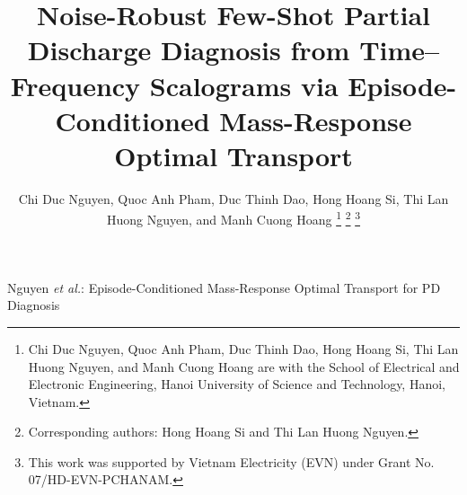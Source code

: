 \documentclass[journal]{IEEEtran}
\newcommand{\1}{\mathbf{1}}
\begin{document}
\title{Noise-Robust Few-Shot Partial Discharge Diagnosis from Time--Frequency Scalograms via Episode-Conditioned Mass-Response Optimal Transport}

\author{Chi Duc Nguyen,
        Quoc Anh Pham,
        Duc Thinh Dao,
        Hong Hoang Si,
        Thi Lan Huong Nguyen,
        and Manh Cuong Hoang%
\thanks{Chi Duc Nguyen, Quoc Anh Pham, Duc Thinh Dao, Hong Hoang Si, Thi Lan Huong Nguyen, and Manh Cuong Hoang are with the School of Electrical and Electronic Engineering, Hanoi University of Science and Technology, Hanoi, Vietnam.}%
\thanks{Corresponding authors: Hong Hoang Si and Thi Lan Huong Nguyen.}%
\thanks{This work was supported by Vietnam Electricity (EVN) under Grant No. 07/HD-EVN-PCHANAM.}%
}

%
{Nguyen \MakeLowercase{\textit{et al.}}: Episode-Conditioned Mass-Response Optimal Transport for PD Diagnosis}

\maketitle
\end{document}
